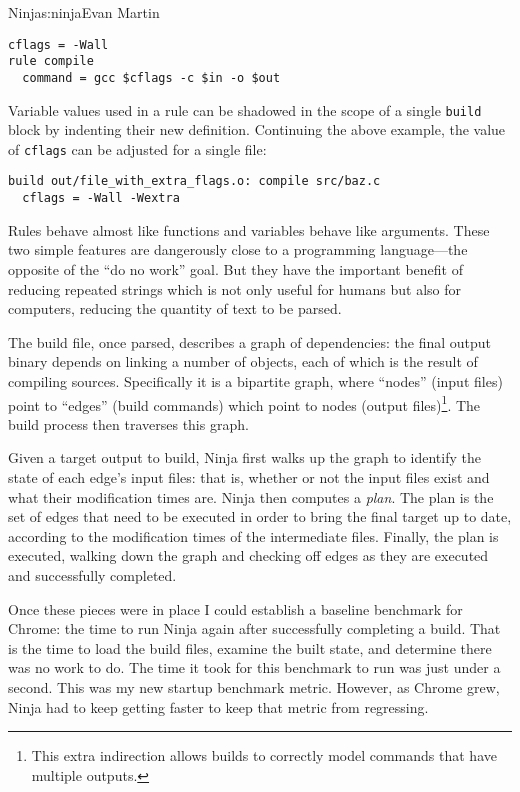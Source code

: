 \begin{aosachapter}{Ninja}{s:ninja}{Evan Martin}
\begin{verbatim}
cflags = -Wall
rule compile
  command = gcc $cflags -c $in -o $out
\end{verbatim}

\noindent Variable values used in a rule can be shadowed in the scope 
of a single
\texttt{build} block by indenting their new definition. Continuing the
above example, the value of \texttt{cflags} can be adjusted for a single
file:

\begin{verbatim}
build out/file_with_extra_flags.o: compile src/baz.c
  cflags = -Wall -Wextra
\end{verbatim}

Rules behave almost like functions and variables behave like arguments.
These two simple features are dangerously close to a programming
language---the opposite of the ``do no work'' goal. But they have the
important benefit of reducing repeated strings which is not only useful
for humans but also for computers, reducing the quantity of text to be
parsed.

The build file, once parsed, describes a graph of dependencies: the
final output binary depends on linking a number of objects, each of
which is the result of compiling sources. Specifically it is a bipartite
graph, where ``nodes'' (input files) point to ``edges'' (build commands)
which point to nodes (output files)\footnote{This extra indirection
  allows builds to correctly model commands that have multiple outputs.}.
The build process then traverses this graph.

Given a target output to build, Ninja first walks up the graph to
identify the state of each edge's input files: that is, whether or not
the input files exist and what their modification times are. Ninja then
computes a \emph{plan}. The plan is the set of edges that need to be
executed in order to bring the final target up to date, according to the
modification times of the intermediate files. Finally, the plan is
executed, walking down the graph and checking off edges as they are
executed and successfully completed.

Once these pieces were in place I could establish a baseline benchmark
for Chrome: the time to run Ninja again after successfully completing a
build. That is the time to load the build files, examine the built
state, and determine there was no work to do. The time it took for this
benchmark to run was just under a second. This was my new startup
benchmark metric. However, as Chrome grew, Ninja had to keep getting
faster to keep that metric from regressing.


\end{aosachapter}
